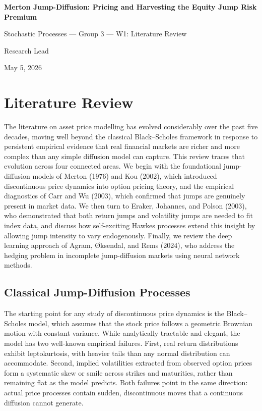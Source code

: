 \documentclass[12pt]{article}
\begin{document}
\begin{titlepage}
    \centering
    \vspace*{3cm}
    {\Huge \textbf{Merton Jump-Diffusion: Pricing and Harvesting
the Equity Jump Risk Premium} \par}
    \vspace{0.5cm}
    {\large Stochastic Processes --- Group 3 --- W1: Literature Review \par}
    \vspace{2cm}
    {\Large Research Lead \par}
    \vspace{1cm}
    {\large May 5, 2026 \par}
    \vfill
    
\end{titlepage}

\section*{Literature Review}

The literature on asset price modelling has evolved considerably over the past five decades, moving well beyond the classical Black--Scholes framework in response to persistent empirical evidence that real financial markets are richer and more complex than any simple diffusion model can capture. This review traces that evolution across four connected areas. We begin with the foundational jump-diffusion models of Merton (1976) and Kou (2002), which introduced discontinuous price dynamics into option pricing theory, and the empirical diagnostics of Carr and Wu (2003), which confirmed that jumps are genuinely present in market data. We then turn to Eraker, Johannes, and Polson (2003), who demonstrated that both return jumps and volatility jumps are needed to fit index data, and discuss how self-exciting Hawkes processes extend this insight by allowing jump intensity to vary endogenously. Finally, we review the deep learning approach of Agram, \O{}ksendal, and Rems (2024), who address the hedging problem in incomplete jump-diffusion markets using neural network methods.

\subsection*{Classical Jump-Diffusion Processes}

The starting point for any study of discontinuous price dynamics is the Black--Scholes model, which assumes that the stock price follows a geometric Brownian motion with constant variance. While analytically tractable and elegant, the model has two well-known empirical failures. First, real return distributions exhibit leptokurtosis, with heavier tails than any normal distribution can accommodate. Second, implied volatilities extracted from observed option prices form a systematic skew or smile across strikes and maturities, rather than remaining flat as the model predicts. Both failures point in the same direction: actual price processes contain sudden, discontinuous moves that a continuous diffusion cannot generate.
\end{document}
